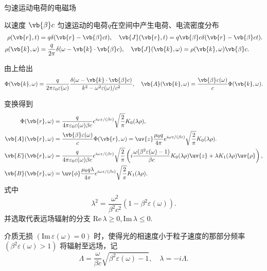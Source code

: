 \begin{example}
	匀速运动电荷的电磁场

	以速度 \(\vb{\beta}c\) 匀速运动的电荷\(q\)在空间中产生电荷、电流密度分布
	\begin{align*}
		\rho(\vb{r},t) &= q \delta(\vb{r} - \vb{\beta} c t), \quad
		\vb{J}(\vb{r},t) = q \vb{\beta} c \delta(\vb{r} - \vb{\beta} c t). \\
		\rho(\vb{k},\omega) &= \frac{q}{2\pi} \delta(\omega - \vb{k} \cdot \vb{\beta} c), \quad
		\vb{J}(\vb{k},\omega) = \rho(\vb{k},\omega) \vb{\beta} c.
	\end{align*}

	由上给出
	\begin{equation*}
		\Phi(\vb{k},\omega) = \frac{q}{2\pi \varepsilon_{0} \varepsilon(\omega)} \frac{\delta(\omega - \vb{k} \cdot \vb{\beta} c)}{k^{2} - \omega^{2} \varepsilon(\omega)/c^{2}}, \quad
		\vb{A}(\vb{k},\omega) = \frac{\vb{\beta} \varepsilon(\omega)}{c} \Phi(\vb{k},\omega).
	\end{equation*}

	变换得到
	\begin{align*}
		\Phi(\vb{r},\omega) &= \frac{q}{4\pi \varepsilon_{0} \varepsilon(\omega) \beta c} e^{i\omega z/(\beta c)} \sqrt{\frac{2}{\pi}} K_{0}(\lambda \rho), \\
		\vb{A}(\vb{r},\omega) &= \frac{\vb{\beta} \varepsilon(\omega)}{c} \Phi(\vb{r},\omega) = \uv{z} \frac{\mu_{0} q}{4\pi} e^{i\omega z/(\beta c)} \sqrt{\frac{2}{\pi}} K_{0}(\lambda \rho).\\
		\vb{E}(\vb{r},\omega) &= \frac{q}{4\pi \varepsilon_{0} \varepsilon(\omega) \beta c} e^{i\omega z/(\beta c)} \sqrt{\frac{2}{\pi}} \left( i \frac{\omega (\beta^{2} \varepsilon(\omega) - 1)}{\beta c} K_{0}(\lambda \rho) \uv{z} + \lambda K_{1}(\lambda \rho) \uv{\rho} \right), \\
		\vb{B}(\vb{r},\omega) &= \uv{\phi} \frac{\mu_{0} q \lambda}{4\pi} e^{i\omega z/(\beta c)} \sqrt{\frac{2}{\pi}} K_{1}(\lambda \rho).
	\end{align*}
	式中
	\begin{equation*}
		\lambda^{2} = \frac{\omega^{2}}{\beta^{2} c^{2}} (1 - \beta^{2} \varepsilon(\omega)).
	\end{equation*}
	并选取代表远场辐射的分支 \(\mathrm{Re} \, \lambda \ge 0, \mathrm{Im} \, \lambda \le 0\).

	介质无损 \((\mathrm{Im} \, \varepsilon(\omega) = 0)\) 时，使得光的相速度小于粒子速度的那部分频率 \((\beta^{2} \varepsilon(\omega) > 1)\) 将辐射至远场，记
	\begin{equation*}
		\Lambda = \frac{\omega}{\beta c} \sqrt{\beta^{2} \varepsilon(\omega) - 1}, \quad
		\lambda= -i \Lambda.
	\end{equation*}


\end{example}
